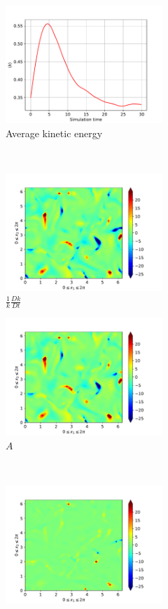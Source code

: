 \begin{figure}[H]
    \begin{subfigure}[H]{0.45\textwidth}
        \includegraphics[height=1.75in]{media/run-cds-65/ke-average1340}
        \caption{Average kinetic energy}
    \end{subfigure}
    ~
    \begin{subfigure}[H]{0.45\textwidth}
        \includegraphics[height=1.75in]{media/run-cds-65/ke-1340}
        \caption{$\frac{1}{k} \frac{D k}{Dt}$}
    \end{subfigure}
    \newline
    \begin{subfigure}{0.45\textwidth}
        \includegraphics[height=1.75in]{media/run-cds-65/A-ke-1340}
        \caption{$A$}
    \end{subfigure}
    ~
    \begin{subfigure}{0.45\textwidth}
        \includegraphics[height=1.75in]{media/run-cds-65/C-ke-1340}

\end{subfigure}
\end{figure}
